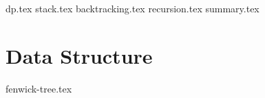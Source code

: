 \documentclass{../latex-setting/cmemoir}
\begin{document}

\frontmatter

\tableofcontents

\restoregeometry%

\mainmatter{}


{dp.tex}
{stack.tex}
{backtracking.tex}
{recursion.tex}
{summary.tex}


\part{Data Structure}
{fenwick-tree.tex}
% 
\end{document}
